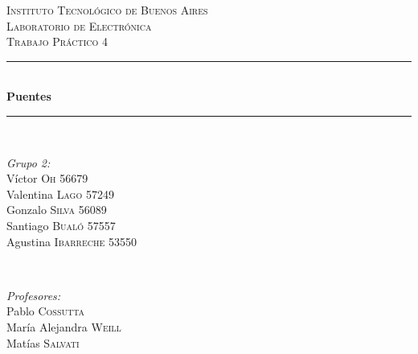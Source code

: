 \begin{titlepage}
    \newcommand{\HRule}{\rule{\linewidth}{0.5mm}}
    \center
    \textsc{\LARGE Instituto Tecnológico de Buenos Aires}\\[1.2cm]
    \textsc{\Large Laboratorio de Electrónica}\\[0.5cm]
    \textsc{\large Trabajo Práctico 4}\\[0.5cm]
    
    \HRule \\[0.4cm]
    { \huge \bfseries Puentes }\\[0.4cm] %
    \HRule \\[1.5cm]
    
    
    \begin{minipage}{0.4\textwidth}
    \begin{flushleft} \large
    \emph{Grupo 2:}\\
    Víctor \textsc{Oh} 56679\\
    Valentina \textsc{Lago}  57249\\
    Gonzalo \textsc{Silva} 56089\\
    Santiago \textsc{Bualó}   57557\\
    Agustina \textsc{Ibarreche} 53550\\
    \end{flushleft}
    \end{minipage}
    ~
    \begin{minipage}{0.4\textwidth}
    \begin{flushright} \large
    \emph{Profesores:} \\
    Pablo  \textsc{Cossutta}\\
    María Alejandra \textsc{Weill}\\
    Matías \textsc{Salvati}
    \end{flushright}
    \end{minipage}\\[4cm]
    
    \vfill %
\end{titlepage}